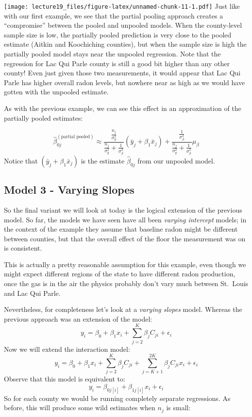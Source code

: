 \documentclass[
]{article}
\begin{document}
\texttt{[image: lecture19\_files/figure-latex/unnamed-chunk-11-1.pdf]}
Just like with our first example, we see that the partial pooling
approach creates a ``compromise'' between the pooled and unpooled
models. When the county-level sample size is low, the partially pooled
prediction is very close to the pooled estimate (Aitkin and Koochiching
counties), but when the sample size is high the partially pooled model
stays near the unpooled regression. Note that the regression for Lac Qui
Parle county is still a good bit higher than any other county! Even just
given those two measurements, it would appear that Lac Qui Parle has
higher overall radon levels, but nowhere near as high as we would have
gotten with the unpooled estimate.

As with the previous example, we can see this effect in an approximation
of the partially pooled estimates:

\[
\hat \beta_{0j}^{(\text{partial pooled})} \approx \frac{ \frac{n_j}{\sigma^2_y} }{\frac{n_j}{\sigma^2_y}  + \frac{1}{\sigma^2_{\beta}}} (\bar y_j + \beta_1 \bar x_j)  + \frac{ \frac{1}{\sigma^2_{\beta}} }{\frac{n_j}{\sigma^2_y} + \frac{1}{\sigma^2_{\beta}}} \mu_{\beta}
\] Notice that \((\bar y_j + \beta_1 \bar x_j)\) is the estimate
\(\hat \beta_{0j}\) from our unpooled model.

\hypertarget{model-3---varying-slopes}{%
\subsection{Model 3 - Varying Slopes}\label{model-3---varying-slopes}}

So the final variant we will look at today is the logical extension of
the previous model. So far, the models we have seen have all been
\emph{varying intercept} models; in the context of the example they
assume that baseline radon might be different between counties, but that
the overall effect of the floor the measurement was on is consistent.

This is actually a pretty reasonable assumption for this example, even
though we might expect different regions of the state to have different
radon production, once the gas is in the air the physics probably don't
vary much between St.~Louis and Lac Qui Parle.

Nevertheless, for completeness let's look at a \emph{varying slopes}
model. Whereas the previous approach was an extension of the model: \[
y_i = \beta_0 + \beta_1 x_i + \sum_{j=2}^K \beta_j C_{ji} + \epsilon_i 
\] Now we will extend the interaction model: \[
y_i = \beta_0 + \beta_1 x_i + \sum_{j=2}^K \beta_j C_{ji} + \sum_{j=K+1}^{2K} \beta_j C_{ji} x_i + \epsilon_i 
\] Observe that this model is equivalent to: \[
y_i = \beta_{0j[i]} + \beta_{1j[i]} x_i + \epsilon_i 
\] So for each county we would be running completely separate
regressions. As before, this will produce some wild estimates when
\(n_j\) is small:
\end{document}
